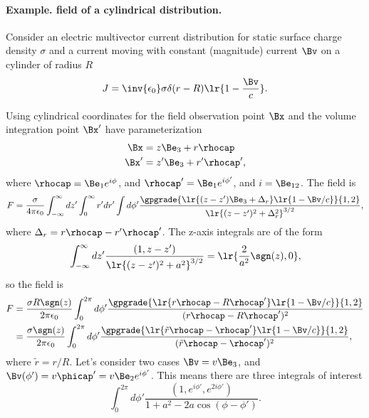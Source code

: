 %
%

\paragraph{Example.  field of a cylindrical distribution.}

Consider an electric multivector current distribution for static surface charge density \( \sigma \) and a current moving with constant (magnitude) current \( \Bv \) on a cylinder of radius \( R \)
\begin{equation}\label{eqn:cylinderField:20}
J = \inv{\epsilon_0} \sigma \delta( r - R ) \lr{ 1 - \frac{\Bv}{c} }.
\end{equation}

Using cylindrical coordinates for the field observation point \( \Bx \) and the volume integration point \( \Bx' \) have parameterization
\begin{equation}\label{eqn:cylinderField:40}
\begin{aligned}
\Bx &= z \Be_3 + r \rhocap \\
\Bx' &= z' \Be_3 + r' \rhocap',
\end{aligned}
\end{equation}
where \( \rhocap = \Be_1 e^{i \phi} \), and \( \rhocap' = \Be_1 e^{i \phi'} \), and \( i = \Be_{12} \).
The field is
\begin{equation}\label{eqn:cylinderField:60}
F = \frac{\sigma}{4 \pi \epsilon_0}
\int_{-\infty}^\infty dz' \int_0^\infty r' dr' \int d\phi' \frac{
   \gpgrade{ \lr{ (z-z') \Be_3 + \Delta_r }\lr{ 1 - \Bv/c }  }{1,2}
}{ \lr{ (z -z')^2 + \Delta_r^2 }^{3/2} },
\end{equation}
where \( \Delta_r = r \rhocap - r' \rhocap' \).
The z-axis integrals are of the form
\begin{equation}\label{eqn:cylinderField:80}
\int_{-\infty}^\infty dz' \frac{ (1, z-z') }{ \lr{(z-z')^2 + a^2 }^{3/2}}
=
\lr{ \frac{2}{a^2} \sgn(z), 0 },
\end{equation}
so the field is
\begin{equation}\label{eqn:cylinderField:100}
\begin{aligned}
F
&=
\frac{\sigma R \sgn(z)}{2 \pi \epsilon_0}
\int_0^{2 \pi} d\phi' \frac{
   \gpgrade{ \lr{ r\rhocap - R \rhocap' } \lr{ 1 - \Bv/c } }{1,2}
}
{ (r\rhocap - R \rhocap')^2 } \\
&=
\frac{\sigma \sgn(z)}{2 \pi \epsilon_0}
\int_0^{2 \pi} d\phi' \frac{
   \gpgrade{ \lr{ \tilde{r}\rhocap - \rhocap' } \lr{ 1 - \Bv/c } }{1,2}
}
{ (\tilde{r}\rhocap - \rhocap')^2 },
\end{aligned}
\end{equation}
where \( \tilde{r} = r/R \).
Let's consider two cases \( \Bv = v \Be_3 \), and \( \Bv(\phi') = v \phicap' = v \Be_2 e^{i\phi'} \).  This means there are three integrals of interest
\begin{equation}\label{eqn:cylinderField:120}
\int_0^{2 \pi} d\phi' \frac{(1, e^{i\phi'}, e^{2 i\phi'})}{1 + a^2 - 2 a \cos(\phi-\phi')}.
\end{equation}
